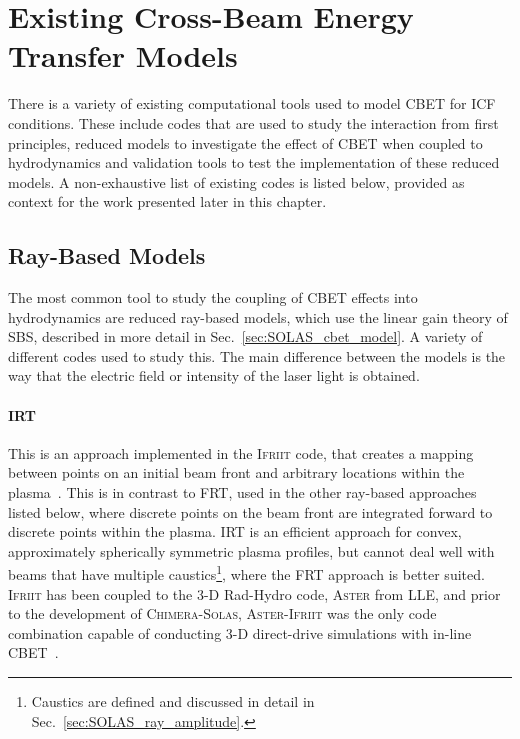 \section{Existing Cross-Beam Energy Transfer Models}

There is a variety of existing computational tools used to model \ac{CBET} for \ac{ICF} conditions.
These include codes that are used to study the interaction from first principles, reduced models to investigate the effect of \ac{CBET} when coupled to hydrodynamics and validation tools to test the implementation of these reduced models.
A non-exhaustive list of existing codes is listed below, provided as context for the work presented later in this chapter.

\subsection{Ray-Based Models}

The most common tool to study the coupling of \ac{CBET} effects into hydrodynamics are reduced ray-based models, which use the linear gain theory of \ac{SBS}, described in more detail in Sec.~\ref{sec:SOLAS_cbet_model}.
A variety of different codes used to study this.
The main difference between the models is the way that the electric field or intensity of the laser light is obtained.

\paragraph*{\ac{IRT}} This is an approach implemented in the \textsc{Ifriit} code, that creates a mapping between points on an initial beam front and arbitrary locations within the plasma~\cite{colaitis_real_2019,colaitis_adaptive_2019}.
This is in contrast to \ac{FRT}, used in the other ray-based approaches listed below, where discrete points on the beam front are integrated forward to discrete points within the plasma.
\ac{IRT} is an efficient approach for convex, approximately spherically symmetric plasma profiles, but cannot deal well with beams that have multiple caustics\footnote{Caustics are defined and discussed in detail in Sec.~\ref{sec:SOLAS_ray_amplitude}.}, where the \ac{FRT} approach is better suited.
\textsc{Ifriit} has been coupled to the 3-D \ac{Rad-Hydro} code, \textsc{Aster} from \ac{LLE}, and prior to the development of \textsc{Chimera}-\textsc{Solas}, \textsc{Aster}-\textsc{Ifriit} was the only code combination capable of conducting 3-D direct-drive simulations with in-line \ac{CBET}~\cite{colaitis_inverse_2021}.


